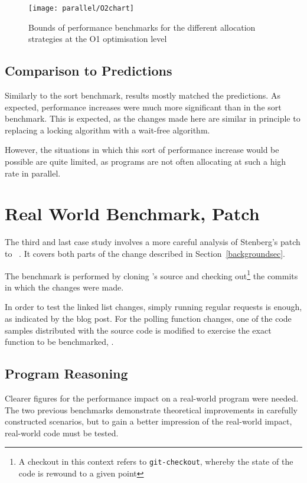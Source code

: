\begin{figure}[hp]
	\centering
	\texttt{[image: parallel/O2chart]}
	\caption{Bounds of performance benchmarks for the different allocation strategies at the O1 optimisation level}\label{lastparallel}
\end{figure}

\subsection{Comparison to Predictions}

Similarly to the sort benchmark, results mostly matched the predictions. As expected, performance increases were much more significant than in the sort benchmark. This is expected, as the changes made here are similar in principle to replacing a locking algorithm with a wait-free algorithm.

However, the situations in which this sort of performance increase would be possible are quite limited, as programs are not often allocating at such a high rate in parallel.

\section{Real World Benchmark,  Patch}

The third and last case study involves a more careful analysis of Stenberg's patch to ~\cite{curlmalloc}. It covers both parts of the change described in Section~\ref{backgroundsec}.

The benchmark is performed by cloning 's source and checking out\footnote{A checkout in this context refers to \texttt{git-checkout}, whereby the state of the code is rewound to a given point} the commits in which the changes were made.

In order to test the linked list changes, simply running regular  requests is enough, as indicated by the blog post. For the polling function changes, one of the code samples distributed with the  source code is modified to exercise the exact function to be benchmarked, .

\subsection{Program Reasoning}

Clearer figures for the performance impact on a real-world program were needed. The two previous benchmarks demonstrate theoretical improvements in carefully constructed scenarios, but to gain a better impression of the real-world impact, real-world code must be tested.


